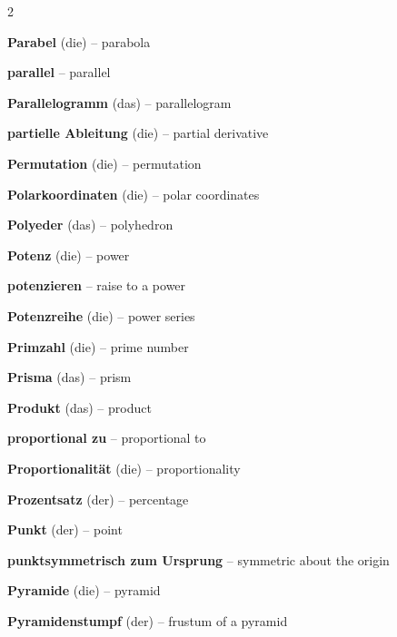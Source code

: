 \begin{multicols}{2}
\par\nopagebreak
\textbf{Parabel} (die) -- parabola\dotfill\hyperref[e:125]{\pageref*{e:125}}\par
\textbf{parallel} -- parallel\dotfill\hyperref[e:150]{\pageref*{e:150}}\par
\textbf{Parallelogramm} (das) -- parallelogram\dotfill\hyperref[e:200]{\pageref*{e:200}}\par
\textbf{partielle Ableitung} (die) -- partial derivative\dotfill\hyperref[e:277]{\pageref*{e:277}}\par
\textbf{Permutation} (die) -- permutation\dotfill\hyperref[e:341]{\pageref*{e:341}}\par
\textbf{Polarkoordinaten} (die) -- polar coordinates\dotfill\hyperref[e:311]{\pageref*{e:311}}\par
\textbf{Polyeder} (das) -- polyhedron\dotfill\hyperref[e:233]{\pageref*{e:233}}\par
\textbf{Potenz} (die) -- power\dotfill\hyperref[e:42]{\pageref*{e:42}}\par
\textbf{potenzieren} -- raise to a power\dotfill\hyperref[e:50]{\pageref*{e:50}}\par
\textbf{Potenzreihe} (die) -- power series\dotfill\hyperref[e:267]{\pageref*{e:267}}\par
\textbf{Primzahl} (die) -- prime number\dotfill\hyperref[e:12]{\pageref*{e:12}}\par
\textbf{Prisma} (das) -- prism\dotfill\hyperref[e:228]{\pageref*{e:228}}\par
\textbf{Produkt} (das) -- product\dotfill\hyperref[e:22]{\pageref*{e:22}}\par
\textbf{proportional zu} -- proportional to\dotfill\hyperref[e:68]{\pageref*{e:68}}\par
\textbf{Proportionalität} (die) -- proportionality\dotfill\hyperref[e:94]{\pageref*{e:94}}\par
\textbf{Prozentsatz} (der) -- percentage\dotfill\hyperref[e:58]{\pageref*{e:58}}\par
\textbf{Punkt} (der) -- point\dotfill\hyperref[e:146]{\pageref*{e:146}}\par
\textbf{punktsymmetrisch zum Ursprung} -- symmetric about the origin\dotfill\hyperref[e:145]{\pageref*{e:145}}\par
\textbf{Pyramide} (die) -- pyramid\dotfill\hyperref[e:230]{\pageref*{e:230}}\par
\textbf{Pyramidenstumpf} (der) -- frustum of a pyramid\dotfill\hyperref[e:235]{\pageref*{e:235}}\par


\end{multicols}
